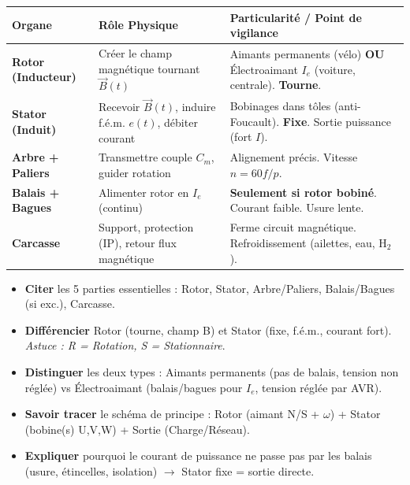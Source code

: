 \documentclass[11pt]{article}
\begin{document}
\begin{center}
\begin{tabularx}{\linewidth}{|l|X|X|}
\hline
\rowcolor{popblueL}
\textbf{Organe} & \textbf{Rôle Physique} & \textbf{Particularité / Point de vigilance} \\
\hline
\textbf{Rotor (Inducteur)} & Créer le champ magnétique tournant $\vec{B}(t)$ & Aimants permanents (vélo) \textbf{OU} Électroaimant $I_e$ (voiture, centrale). \textbf{Tourne}. \\
\hline
\textbf{Stator (Induit)} & Recevoir $\vec{B}(t)$, induire f.é.m. $e(t)$, débiter courant & Bobinages dans tôles (anti-Foucault). \textbf{Fixe}. Sortie puissance (fort $I$). \\
\hline
\textbf{Arbre + Paliers} & Transmettre couple $C_m$, guider rotation & Alignement précis. Vitesse $n = 60f/p$. \\
\hline
\textbf{Balais + Bagues} & Alimenter rotor en $I_e$ (continu) & \textbf{Seulement si rotor bobiné}. Courant faible. Usure lente. \\
\hline
\textbf{Carcasse} & Support, protection (IP), retour flux magnétique & Ferme circuit magnétique. Refroidissement (ailettes, eau, H$_2$). \\
\hline
\end{tabularx}
\end{center}

\begin{aretenir}
\begin{itemize}
    \item \textbf{Citer} les 5 parties essentielles : Rotor, Stator, Arbre/Paliers, Balais/Bagues (si exc.), Carcasse.
    \item \textbf{Différencier} Rotor (tourne, champ B) et Stator (fixe, f.é.m., courant fort). \emph{Astuce : R = Rotation, S = Stationnaire}.
    \item \textbf{Distinguer} les deux types : Aimants permanents (pas de balais, tension non réglée) vs Électroaimant (balais/bagues pour $I_e$, tension réglée par AVR).
    \item \textbf{Savoir tracer} le schéma de principe : Rotor (aimant N/S + $\omega$) + Stator (bobine(s) U,V,W) + Sortie (Charge/Réseau).
    \item \textbf{Expliquer} pourquoi le courant de puissance ne passe pas par les balais (usure, étincelles, isolation) $\rightarrow$ Stator fixe = sortie directe.
\end{itemize}
\end{aretenir}
\end{document}
